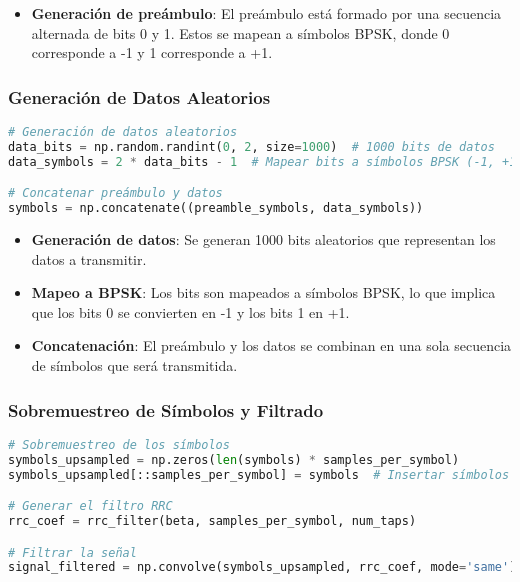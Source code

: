 \documentclass[letterpaper,12pt,oneside]{article}
\begin{document}
\begin{itemize}
    \item \textbf{Generación de preámbulo}: El preámbulo está formado por una secuencia alternada de bits 0 y 1. Estos se mapean a símbolos BPSK, donde 0 corresponde a -1 y 1 corresponde a +1.
\end{itemize}

\subsubsection*{Generación de Datos Aleatorios}

\begin{tcolorbox}[title=\textbf{Generación de Datos Aleatorios}, colframe=black, colback=white]
\begin{lstlisting}[language=Python]
# Generación de datos aleatorios
data_bits = np.random.randint(0, 2, size=1000)  # 1000 bits de datos
data_symbols = 2 * data_bits - 1  # Mapear bits a símbolos BPSK (-1, +1)

# Concatenar preámbulo y datos
symbols = np.concatenate((preamble_symbols, data_symbols))
\end{lstlisting}
\end{tcolorbox}

\begin{itemize}
    \item \textbf{Generación de datos}: Se generan 1000 bits aleatorios que representan los datos a transmitir.
    \item \textbf{Mapeo a BPSK}: Los bits son mapeados a símbolos BPSK, lo que implica que los bits 0 se convierten en -1 y los bits 1 en +1.
    \item \textbf{Concatenación}: El preámbulo y los datos se combinan en una sola secuencia de símbolos que será transmitida.
\end{itemize}

\subsubsection*{Sobremuestreo de Símbolos y Filtrado}

\begin{tcolorbox}[title=\textbf{Sobremuestreo y Filtrado de Símbolos}, colframe=black, colback=white]
\begin{lstlisting}[language=Python]
# Sobremuestreo de los símbolos
symbols_upsampled = np.zeros(len(symbols) * samples_per_symbol)
symbols_upsampled[::samples_per_symbol] = symbols  # Insertar símbolos con ceros entre ellos

# Generar el filtro RRC
rrc_coef = rrc_filter(beta, samples_per_symbol, num_taps)

# Filtrar la señal
signal_filtered = np.convolve(symbols_upsampled, rrc_coef, mode='same')
\end{lstlisting}
\end{tcolorbox}
\end{document}

